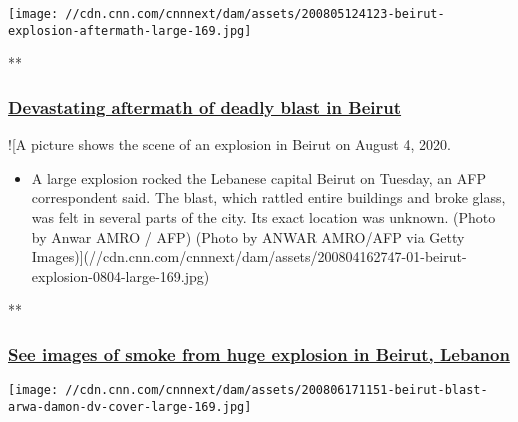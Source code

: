 \href{/videos/world/2020/08/05/lebanon-beirut-explosion-wedeman-pkg-intl-hnk-vpx.cnn/video/playlists/beirut-explosion/}{}

\texttt{[image: //cdn.cnn.com/cnnnext/dam/assets/200805124123-beirut-explosion-aftermath-large-169.jpg]}

**

\hypertarget{devastating-aftermath-of-deadly-blast-in-beirut-}{%
\subsubsection{\texorpdfstring{\href{/videos/world/2020/08/05/lebanon-beirut-explosion-wedeman-pkg-intl-hnk-vpx.cnn/video/playlists/beirut-explosion/}{Devastating
aftermath of deadly blast in Beirut
}}{Devastating aftermath of deadly blast in Beirut }}\label{devastating-aftermath-of-deadly-blast-in-beirut-}}

\href{/videos/world/2020/08/04/beirut-lebanon-explosion-intl-ldn-vpx.cnn/video/playlists/beirut-explosion/}{}

!{[}A picture shows the scene of an explosion in Beirut on August 4,
2020.

\begin{itemize}
\tightlist
\item
  A large explosion rocked the Lebanese capital Beirut on Tuesday, an
  AFP correspondent said. The blast, which rattled entire buildings and
  broke glass, was felt in several parts of the city. Its exact location
  was unknown. (Photo by Anwar AMRO / AFP) (Photo by ANWAR AMRO/AFP via
  Getty
  Images){]}(//cdn.cnn.com/cnnnext/dam/assets/200804162747-01-beirut-explosion-0804-large-169.jpg)
\end{itemize}

**

\hypertarget{see-images-of-smoke-from-huge-explosion-in-beirut-lebanon}{%
\subsubsection{\texorpdfstring{\href{/videos/world/2020/08/04/beirut-lebanon-explosion-intl-ldn-vpx.cnn/video/playlists/beirut-explosion/}{See
images of smoke from huge explosion in Beirut,
Lebanon}}{See images of smoke from huge explosion in Beirut, Lebanon}}\label{see-images-of-smoke-from-huge-explosion-in-beirut-lebanon}}

\href{/videos/world/2020/08/06/beirut-explosion-arwa-damon-lon-orig.cnn/video/playlists/beirut-explosion/}{}

\texttt{[image: //cdn.cnn.com/cnnnext/dam/assets/200806171151-beirut-blast-arwa-damon-dv-cover-large-169.jpg]}

